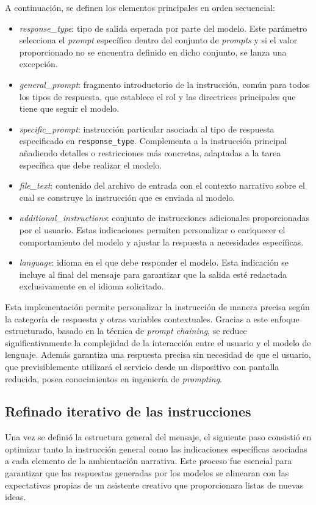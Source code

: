 A continuación, se definen los elementos principales en orden secuencial:
\begin{itemize}
\item \textit{response\_type}:
tipo de salida esperada por parte del modelo.
Este parámetro selecciona el \textit{prompt} específico dentro del conjunto de \textit{prompts}
y si el valor proporcionado no se encuentra definido en dicho conjunto, se lanza una excepción.
\item \textit{general\_prompt}:
fragmento introductorio de la instrucción, común para todos los tipos de respuesta, que establece el rol
y las directrices principales que tiene que seguir el modelo.
\item \textit{specific\_prompt}:
instrucción particular asociada al tipo de respuesta especificado en \texttt{response\_type}.
Complementa a la instrucción principal añadiendo detalles o restricciones más concretas,
adaptadas a la tarea específica que debe realizar el modelo.
\item \textit{file\_text}:
contenido del archivo de entrada con el contexto narrativo sobre el cual se construye
la instrucción que es enviada al modelo.
\item \textit{additional\_instructions}:
conjunto de instrucciones adicionales proporcionadas por el usuario.
Estas indicaciones permiten personalizar o enriquecer el comportamiento del modelo
y ajustar la respuesta a necesidades específicas.
\item \textit{language}:
idioma en el que debe responder el modelo.
Esta indicación se incluye al final del mensaje para garantizar que
la salida esté redactada exclusivamente en el idioma solicitado.
\end{itemize}

Esta implementación permite personalizar la instrucción de manera precisa según la categoría de respuesta
y otras variables contextuales.
Gracias a este enfoque estructurado, basado en la técnica de \textit{prompt chaining},
se reduce significativamente la complejidad de la interacción entre el usuario y el modelo de lenguaje.
Además garantiza una respuesta precisa sin necesidad de que el usuario, 
que previsiblemente utilizará el servicio desde un dispositivo con pantalla reducida,
posea conocimientos en ingeniería de \textit{prompting}.

\subsection{Refinado iterativo de las instrucciones}
Una vez se definió la estructura general del mensaje, el siguiente paso consistió en optimizar tanto la instrucción general
como las indicaciones específicas asociadas a cada elemento de la ambientación narrativa. 
Este proceso fue esencial para garantizar que las respuestas generadas por los modelos se alinearan con las
expectativas propias de un asistente creativo que proporcionara listas de nuevas ideas.

